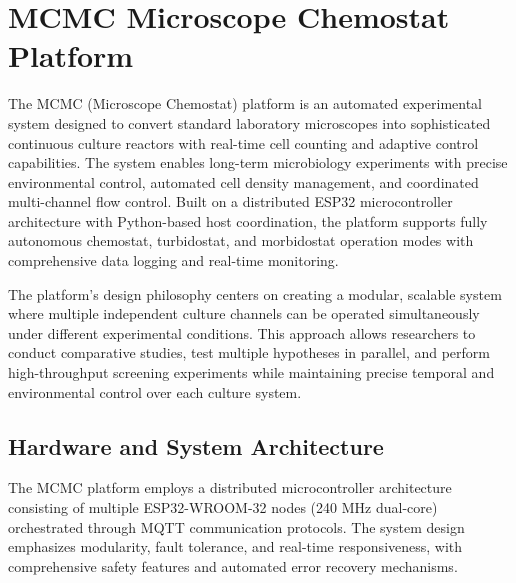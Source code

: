 \section{MCMC Microscope Chemostat Platform}

The MCMC (Microscope Chemostat) platform is an automated experimental system designed to convert standard laboratory microscopes into sophisticated continuous culture reactors with real-time cell counting and adaptive control capabilities. The system enables long-term microbiology experiments with precise environmental control, automated cell density management, and coordinated multi-channel flow control. Built on a distributed ESP32 microcontroller architecture with Python-based host coordination, the platform supports fully autonomous chemostat, turbidostat, and morbidostat operation modes with comprehensive data logging and real-time monitoring.

The platform's design philosophy centers on creating a modular, scalable system where multiple independent culture channels can be operated simultaneously under different experimental conditions. This approach allows researchers to conduct comparative studies, test multiple hypotheses in parallel, and perform high-throughput screening experiments while maintaining precise temporal and environmental control over each culture system.

\subsection{Hardware and System Architecture}

The MCMC platform employs a distributed microcontroller architecture consisting of multiple ESP32-WROOM-32 nodes (240 MHz dual-core) orchestrated through MQTT communication protocols. The system design emphasizes modularity, fault tolerance, and real-time responsiveness, with comprehensive safety features and automated error recovery mechanisms.

